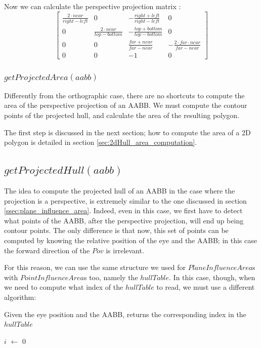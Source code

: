 \documentclass{PoliMi_MasterThesis}
\newcommand*\Let[2]{\State #1 $\gets$ #2}
\begin{document}
Now we can calculate the perspective projection matrix \cite{TODO}:
\begin{equation}
	\begin{bmatrix}
		\frac{2\cdot near}{right-left} & 0 & -\frac{right+left}{right-left} & 0 \\
		0 & \frac{2\cdot near}{top-bottom} & -\frac{top+bottom}{top-bottom} & 0 \\
		0 & 0 & \frac{far+near}{far-near} & -\frac{2\cdot far \cdot near}{far-near} \\
		0 & 0 & -1 & 0
	\end{bmatrix}
\end{equation}

\subsubsection*{$getProjectedArea(aabb)$}
Differently from the orthographic case, there are no shortcuts to compute the area of the perspective projection of an AABB. We must compute the contour points of the projected hull, and calculate the area of the resulting polygon.

The first step is discussed in the next section; how to compute the area of a 2D polygon is detailed in section \ref{sec:2dHull_area_computation}.

\subsection*{$getProjectedHull(aabb)$}
The idea to compute the projected hull of an AABB in the case where the projection is a perspective, is extremely similar to the one discussed in section \ref{ssec:plane_influence_area}. Indeed, even in this case, we first have to detect what points of the AABB, after the perspective projection, will end up being contour points. The only difference is that now, this set of points can be computed by knowing the relative position of the eye and the AABB; in this case the forward direction of the $Pov$ is irrelevant. 

For this reason, we can use the same structure we used for $PlaneInfluenceArea$s with $PointInfluenceArea$s too, namely the $hullTable$. In this case, though, when we need to compute what index of the $hullTable$ to read, we must use a different algorithm:

\begin{algorithm}[H]
	\caption{Given the eye position and the AABB, returns the corresponding index in the $hullTable$}
	\begin{algorithmic}[1]
		\Let{$i$}{0}
		\State{$\textbf{if}\; eye.x < aabb.min.x \; \textbf{then} \; i = i | 1$}
		\State {}
		\EndFunction
	\end{algorithmic}
\end{algorithm} 
\end{document}
